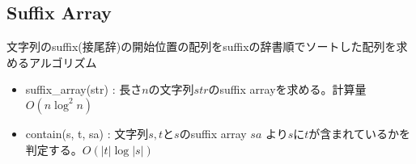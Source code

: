 \subsection{Suffix Array}

文字列のsuffix(接尾辞)の開始位置の配列をsuffixの辞書順でソートした配列を求めるアルゴリズム

\begin{itemize}
    \item suffix\_array(str) : 長さ$n$の文字列$str$のsuffix arrayを求める。計算量$O(n\log^2 n)$
    \item contain(s, t, sa) : 文字列$s,t$と$s$のsuffix array $sa$ より$s$に$t$が含まれているかを判定する。$O(|t| \log |s|)$
\end{itemize}

